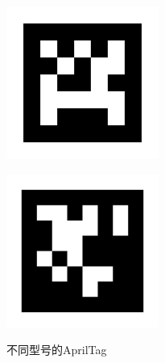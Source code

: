 \begin{figure}[htb]
\begin{minipage}[t]{0.33\linewidth}
		\includegraphics[width=\columnwidth]{figures/2-9b.png} 
		\label{fig:2-9b} 
	\end{minipage}
	\begin{minipage}[t]{0.33\linewidth} 
		\centering
		\includegraphics[width=\columnwidth]{figures/2-9c.png} 
		\label{fig:2-9c} 
	\end{minipage}
	\caption{不同型号的AprilTag}
	\label{fig:2-9}
\end{figure}

